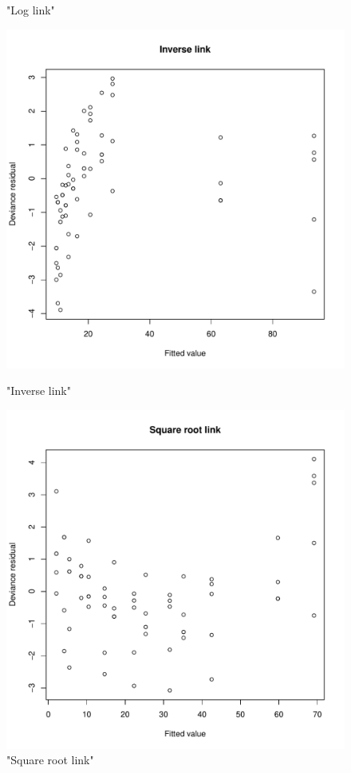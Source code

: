 \documentclass[]{article}
\begin{document}
\begin{enumerate}
{\begin{figure}
	\caption{"Log link"}
	\label{D_res_log}
	\endminipage\hfill
	\includegraphics[width = \textwidth]{pic/HW2_4/d_res_inv}
	\caption{"Inverse link"}
	\label{D_res_inv}
	\endminipage\hfill
	\includegraphics[width = \textwidth]{pic/HW2_4/d_res_squ}
	\caption{"Square root link"}
	\label{D_res_squ}
	\endminipage\hfill
\end{figure}

}
\end{enumerate}
\end{document}
